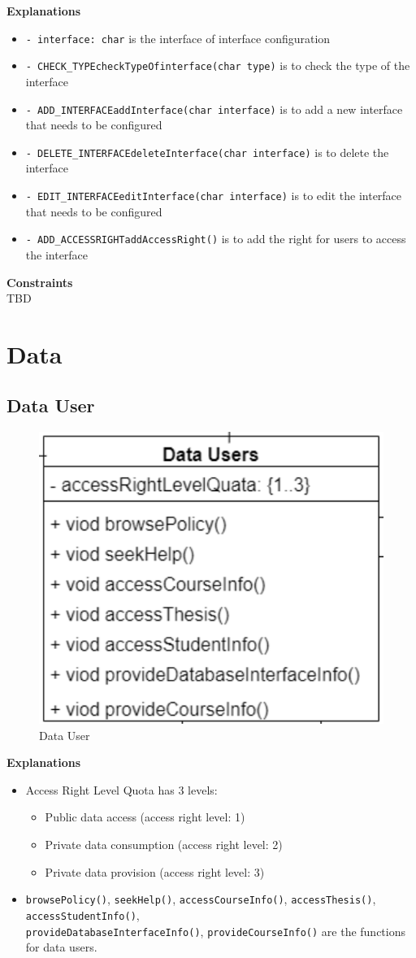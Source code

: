 \textbf{Explanations}
\begin{itemize}
    \item \texttt{- interface: char} is the interface of interface configuration
    \item \texttt{- CHECK\_TYPEcheckTypeOfinterface(char type)} is to check the type of the interface
    \item \texttt{- ADD\_INTERFACEaddInterface(char interface)} is to add a new interface that needs to be configured
    \item \texttt{- DELETE\_INTERFACEdeleteInterface(char interface)} is to delete the interface
    \item \texttt{- EDIT\_INTERFACEeditInterface(char interface)} is to edit the interface that needs to be configured
    \item \texttt{- ADD\_ACCESSRIGHTaddAccessRight()} is to add the right for users to access the interface
\end{itemize}

\textbf{Constraints} \\
TBD

\section{Data}

\subsection{Data User}

\begin{figure}[H]
    \centering
    \includegraphics[width=0.3\linewidth]{picture/3-6/3-6-1.jpg}
    \caption{Data User}
    \label{fig:enter-label}
\end{figure}

\textbf{Explanations}
\begin{itemize}
    \item Access Right Level Quota has 3 levels:
    \begin{itemize}
        \item Public data access (access right level: 1)
        \item Private data consumption (access right level: 2)
        \item Private data provision (access right level: 3)
    \end{itemize}
    \item \texttt{browsePolicy()}, \texttt{seekHelp()}, \texttt{accessCourseInfo()}, \texttt{accessThesis()}, \texttt{accessStudentInfo()},\\ \texttt{provideDatabaseInterfaceInfo()}, \texttt{provideCourseInfo()} are the functions for data users.
\end{itemize}

